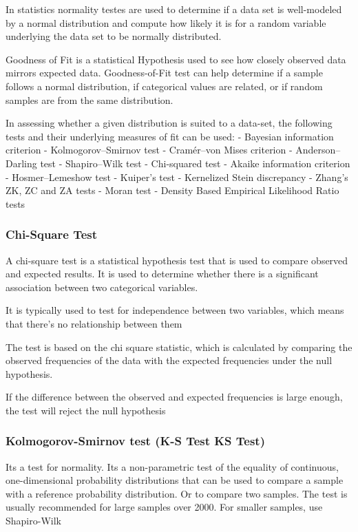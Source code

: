 \documentclass[11pt]{article}
\begin{document}
In statistics normality testes are used to determine if a data set is
well-modeled by a normal distribution and compute how likely it is for a
random variable underlying the data set to be normally distributed.

Goodness of Fit is a statistical Hypothesis used to see how closely
observed data mirrors expected data. Goodness-of-Fit test can help
determine if a sample follows a normal distribution, if categorical
values are related, or if random samples are from the same distribution.

In assessing whether a given distribution is suited to a data-set, the
following tests and their underlying measures of fit can be used: -
Bayesian information criterion - Kolmogorov--Smirnov test - Cramér--von
Mises criterion - Anderson--Darling test - Shapiro--Wilk test -
Chi-squared test - Akaike information criterion - Hosmer--Lemeshow test
- Kuiper's test - Kernelized Stein discrepancy - Zhang's ZK, ZC and ZA
tests - Moran test - Density Based Empirical Likelihood Ratio tests

\hypertarget{chi-square-test}{%
\subsubsection{Chi-Square Test}\label{chi-square-test}}

A chi-square test is a statistical hypothesis test that is used to
compare observed and expected results. It is used to determine whether
there is a significant association between two categorical variables.

It is typically used to test for independence between two variables,
which means that there's no relationship between them

The test is based on the chi square statistic, which is calculated by
comparing the observed frequencies of the data with the expected
frequencies under the null hypothesis.

If the difference between the observed and expected frequencies is large
enough, the test will reject the null hypothesis

\hypertarget{kolmogorov-smirnov-test-k-s-test-ks-test}{%
\subsubsection{Kolmogorov-Smirnov test (K-S Test \textbar{} KS
Test)}\label{kolmogorov-smirnov-test-k-s-test-ks-test}}

Its a test for normality. Its a non-parametric test of the equality of
continuous, one-dimensional probability distributions that can be used
to compare a sample with a reference probability distribution. Or to
compare two samples. The test is usually recommended for large samples
over 2000. For smaller samples, use Shapiro-Wilk
\end{document}
